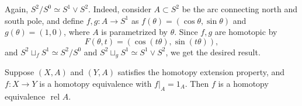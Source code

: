 \begin{exmp} Again, $S^2/S^0\simeq S^1\vee S^2$. Indeed, consider $A\subset S^2$ be the arc connecting north and south pole, and define $f,g:A\rightarrow S^1$ as $f(\theta)=(\cos \theta, \sin\theta)$ and $g(\theta)=(1,0)$, where $A$ is parametrized by $\theta$. Since $f,g$ are homotopic by
\begin{equation}
F(\theta,t)=(\cos (t\theta),\sin(t\theta)),
\end{equation}
and $S^2\sqcup_f S^1\simeq S^2/S^0$ and $S^2\sqcup_g S^1\simeq S^1\vee S^2$, we get the desired result.
\end{exmp}

\begin{prop} Suppose $(X,A)$ and $(Y,A)$ satisfies the homotopy extension property, and $f:X\rightarrow Y$ is a homotopy equivalence with $f|_A=1_A$. Then $f$ is a homotopy equivalence $\textrm{ rel }A$.
\end{prop}
